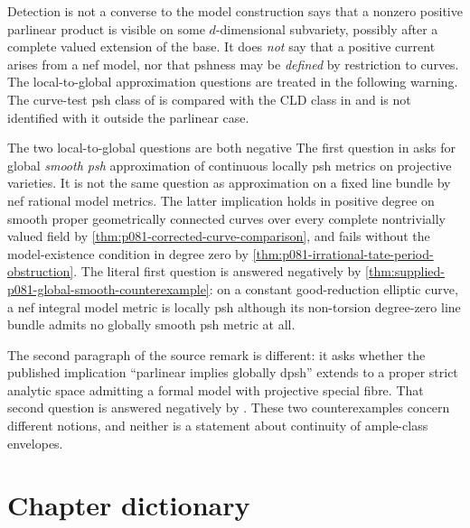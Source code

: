 \noindent\begin{minipage}{\textwidth}
\begin{warning}{Detection is not a converse to the model construction}
 says that a nonzero positive parlinear
product is visible on some $d$-dimensional subvariety, possibly after a
complete valued extension of the base.  It does \emph{not} say that a
positive current arises from a nef model, nor that pshness may be
\emph{defined} by restriction to curves.  The local-to-global approximation questions are treated in the
following warning.  The curve-test psh class of \cite{GR25Classical}
is compared with the CLD class in
 and is not identified
with it outside the parlinear case.
\end{warning}
\end{minipage}\par

\begin{warning}{The two local-to-global questions are both negative}
The first question in \cite[Remark~17.8.10]{CLD25} asks for global
\emph{smooth psh} approximation of continuous locally psh metrics on
projective varieties.  It is not the same question as approximation on a
fixed line bundle by nef rational model metrics.  The latter implication
holds in positive degree on smooth proper geometrically connected curves
over every complete nontrivially valued field by
\cref{thm:p081-corrected-curve-comparison}, and fails without the
model-existence condition in degree zero by
\cref{thm:p081-irrational-tate-period-obstruction}.  The literal first
question is answered negatively by
\cref{thm:supplied-p081-global-smooth-counterexample}: on a constant
good-reduction elliptic curve, a nef integral model metric is locally psh
although its non-torsion degree-zero line bundle admits no globally smooth
psh metric at all.

The second paragraph of the source remark is different: it asks whether the published implication
``parlinear implies globally dpsh'' extends to a proper strict analytic
space admitting a formal model with projective special fibre.  That second
question is answered negatively by
.  These two
counterexamples concern different notions, and neither is a statement about
continuity of ample-class envelopes.
\end{warning}

\section{Chapter dictionary}
\label{sec:ch17-dictionary}

